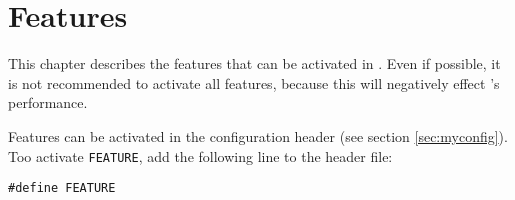 \chapter{Features}
\label{sec:features}

\newcommand{\feature}[1]{\texttt{\textbf{#1}}}

This chapter describes the features that can be activated in \es. Even
if possible, it is not recommended to activate all features, because
this will negatively effect \es's performance.

Features can be activated in the configuration header (see section
\vref{sec:myconfig}). Too activate \texttt{FEATURE}, add the following
line to the header file:
\begin{verbatim}
#define FEATURE
\end{verbatim}

